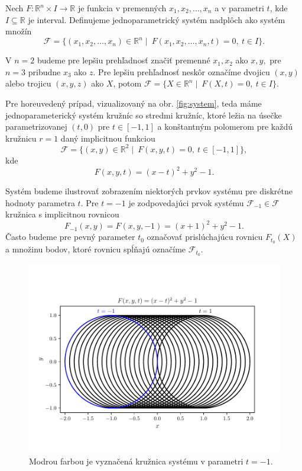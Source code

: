 
\begin{definition}
Nech $F \colon \mathbb{R}^{n} \times I \rightarrow \mathbb{R}$ je funkcia v premenných $ x_{1}, x_{2}, \ldots, x_{n} $ a v parametri $t$, kde $I \subseteq \mathbb{R}$ je interval. Definujeme jednoparametrický systém nadplôch ako systém množín 
$$
\mathcal{F} = \{ (x_{1}, x_{2}, \ldots, x_{n}) \in \mathbb{R}^{n} \mid  \ F(x_{1}, x_{2}, \ldots, x_{n}, t) = 0, \ t \in I \}.
$$
\end{definition}

V $n = 2$ budeme pre lepšiu prehľadnosť značiť premenné $x_{1}, x_{2}$ ako $x, y,$ pre $n = 3$ pribudne $x_{3}$ ako $z.$ Pre lepšiu prehľadnosť neskôr označíme dvojicu $(x,y)$ alebo trojicu $(x,y,z)$ ako $X$, potom
$\mathcal{F} = \{ X \in \mathbb{R}^{n} \mid \ F(X, t) = 0, \ t \in I \}. $

Pre horeuvedený prípad, vizualizovaný na obr. \ref{fig:system}, teda máme jednoparameterický systém kružníc so stredmi kružníc, ktoré ležia na úsečke parametrizovanej $(t,0)$ pre $t \in [-1,1]$ a konštantným polomerom pre každú kružnicu $r = 1$ daný implicitnou funkciou
$$ \mathcal{F} = \{ (x, y) \in \mathbb{R}^{2} \mid \ F(x, y, t) = 0, \ t \in [-1,1] \}, $$
kde
$$ F(x, y, t) = (x - t)^2 + y^2 - 1.$$

Systém budeme ilustrovať zobrazením niektorých prvkov systému pre diskrétne hodnoty parametra $t$. Pre $t = -1$ je zodpovedajúci prvok systému $\mathcal{F}_{-1} \in \mathcal{F}$  kružnica s implicitnou rovnicou
$$ F_{-1}(x, y) = F(x, y, -1) = (x + 1)^2 + y^2 - 1. $$
Často budeme pre pevný parameter $t_0$ označovať prislúchajúcu rovnicu $F_{t_0}(X)$ a množinu bodov, ktoré rovnicu spĺňajú označíme $\mathcal{F}_{t_0}.$

\begin{figure}[h]
	\centering
	\includegraphics[trim={0 1.65cm 0 2cm},clip]{images/one_element_of_the_system.pdf}
	\caption[Zobrazenie prvkov systému.]{Modrou farbou je vyznačená kružnica systému v parametri $t=-1$.}
	\label{fig:one_element_of_system}
\end{figure}

